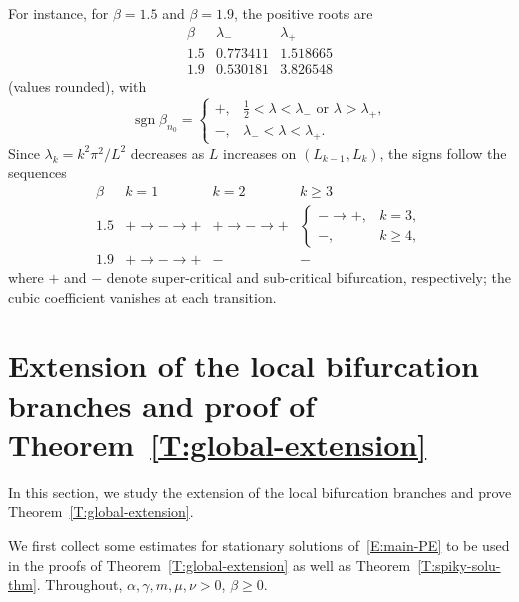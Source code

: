 \documentclass[11pt]{article} %
\theoremstyle{remark}
\theoremstyle{remark}
\numberwithin{equation}{section}
\numberwithin{figure}{section}
\numberwithin{table}{section}
\begin{document}
For instance, for $\beta = 1.5$ and $\beta = 1.9$, the positive roots are
\[
  \begin{array}{c|cc}
    \beta & \lambda_- & \lambda_+\\ \hline
    1.5 & 0.773411 & 1.518665\\
    1.9 & 0.530181 & 3.826548
  \end{array}
\]
(values rounded), with
\[
  \operatorname{sgn}\beta_{n_0}
  =
  \begin{cases}
    +,                             & \frac12<\lambda<\lambda_-
    \text{ or }\lambda>\lambda_+, \\
    -,                             & \lambda_-<\lambda<\lambda_+.
  \end{cases}
\]
Since $\lambda_k = k^2\pi^2/L^2$ decreases as $L$ increases on $(L_{k-1},L_k)$,
the signs follow the sequences
\[
  \begin{array}{c|ccc}
    \beta & k=1 & k=2 & k\ge3\\ \hline
    1.5 & +\to-\to+ & +\to-\to+
    & \begin{cases}
      -\to+, & k=3, \\
      -,     & k\ge4,
    \end{cases}\\[6pt]
    1.9 & +\to-\to+ & - & -
  \end{array}
\]
where $+$ and $-$ denote super-critical and sub-critical bifurcation,
respectively; the cubic coefficient vanishes at each transition.


\section{Extension of the local bifurcation branches and proof of Theorem~\ref{T:global-extension}}
\label{S:global-Bifurcation}


In this section, we study the extension of the local bifurcation branches and
prove Theorem~\ref{T:global-extension}.

We first collect some estimates for stationary solutions of~\eqref{E:main-PE} to
be used in the proofs of Theorem~\ref{T:global-extension} as well as
Theorem~\ref{T:spiky-solu-thm}. Throughout, $\alpha, \gamma, m, \mu, \nu > 0$,
$\beta \ge 0$.
\end{document}
